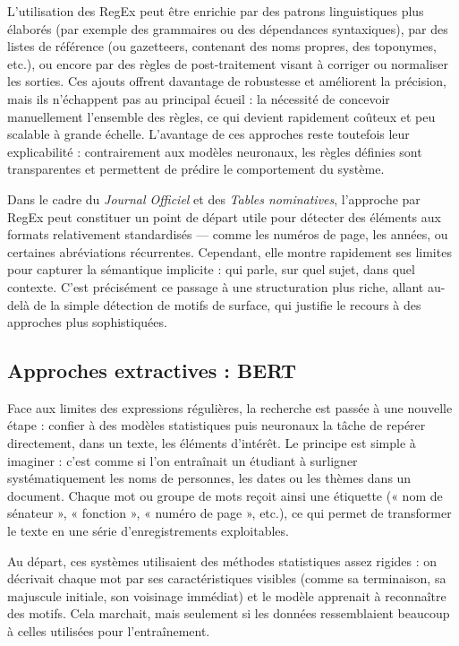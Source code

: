 L’utilisation des RegEx peut être enrichie par des patrons linguistiques plus élaborés (par exemple des grammaires ou des dépendances syntaxiques), par des listes de référence (ou gazetteers, contenant des noms propres, des toponymes, etc.), ou encore par des règles de post-traitement visant à corriger ou normaliser les sorties. Ces ajouts offrent davantage de robustesse et améliorent la précision, mais ils n’échappent pas au principal écueil : la nécessité de concevoir manuellement l’ensemble des règles, ce qui devient rapidement coûteux et peu scalable à grande échelle. L’avantage de ces approches reste toutefois leur explicabilité : contrairement aux modèles neuronaux, les règles définies sont transparentes et permettent de prédire le comportement du système.

Dans le cadre du \emph{Journal Officiel} et des \emph{Tables nominatives}, l’approche par RegEx peut constituer un point de départ utile pour détecter des éléments aux formats relativement standardisés — comme les numéros de page, les années, ou certaines abréviations récurrentes. Cependant, elle montre rapidement ses limites pour capturer la sémantique implicite : qui parle, sur quel sujet, dans quel contexte. C’est précisément ce passage à une structuration plus riche, allant au-delà de la simple détection de motifs de surface, qui justifie le recours à des approches plus sophistiquées. 

\subsection{Approches extractives : BERT}

Face aux limites des expressions régulières, la recherche est passée à une nouvelle étape : confier à des modèles statistiques puis neuronaux la tâche de repérer directement, dans un texte, les éléments d’intérêt. Le principe est simple à imaginer : c’est comme si l’on entraînait un étudiant à surligner systématiquement les noms de personnes, les dates ou les thèmes dans un document. Chaque mot ou groupe de mots reçoit ainsi une étiquette (« nom de sénateur », « fonction », « numéro de page », etc.), ce qui permet de transformer le texte en une série d’enregistrements exploitables.

Au départ, ces systèmes utilisaient des méthodes statistiques assez rigides : on décrivait chaque mot par ses caractéristiques visibles (comme sa terminaison, sa majuscule initiale, son voisinage immédiat) et le modèle apprenait à reconnaître des motifs. Cela marchait, mais seulement si les données ressemblaient beaucoup à celles utilisées pour l’entraînement.

